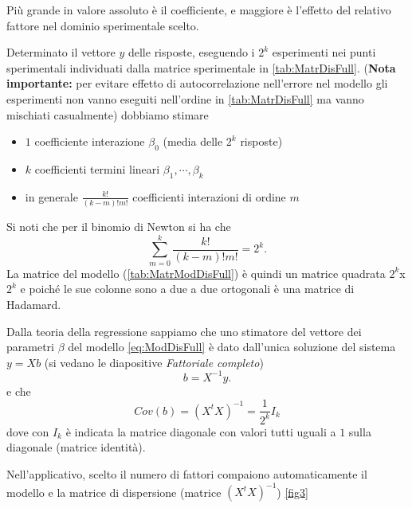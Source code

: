 \documentclass[
]{book}
\begin{document}
Più grande in valore assoluto è il coefficiente, e maggiore è l'effetto del relativo fattore nel dominio sperimentale scelto.

Determinato il vettore \(y\) delle risposte, eseguendo i \(2^k\) esperimenti nei punti sperimentali individuati dalla matrice sperimentale in \autoref{tab:MatrDisFull}.
(\textbf{Nota importante:} per evitare effetto di autocorrelazione nell'errore nel modello gli esperimenti non vanno eseguiti nell'ordine in \autoref{tab:MatrDisFull} ma vanno mischiati casualmente)
dobbiamo stimare

\begin{itemize}
  \item $1$ coefficiente interazione $\beta_0$ (media delle $2^k$ risposte)
  \item $k$ coefficienti termini lineari $\beta_1,\cdots,\beta_k$
  \item in generale $\frac{k!}{(k-m)!m!}$ coefficienti interazioni di ordine $m$
\end{itemize}

Si noti che per il binomio di Newton si ha che
\begin{equation*}
    \sum_{m=0}^k\frac{k!}{(k-m)!m!}=2^k.
\end{equation*}
La matrice del modello (\ref{tab:MatrModDisFull}) è quindi un matrice quadrata \(2^k\)x \(2^k\) e poiché le sue colonne sono a due a due ortogonali è una matrice di Hadamard.

Dalla teoria della regressione sappiamo che uno stimatore del vettore dei parametri \(\beta\) del modello \ref{eq:ModDisFull} è dato dall'unica soluzione del sistema \(y=Xb\) (si vedano le diapositive \emph{Fattoriale completo})
\begin{equation}\label{eq:UnicaSolFull}
    b=X^{-1}y.
\end{equation}
e che
\[
Cov(b)=(X^tX)^{-1}=\frac{1}{2^k}I_k
\]
dove con \(I_k\) è indicata la matrice diagonale con valori tutti uguali a \(1\) sulla diagonale (matrice identità).

Nell'applicativo, scelto il numero di fattori compaiono automaticamente il modello e la matrice di dispersione (matrice \((X^tX)^{-1}\)) \autoref{fig3}
\end{document}
